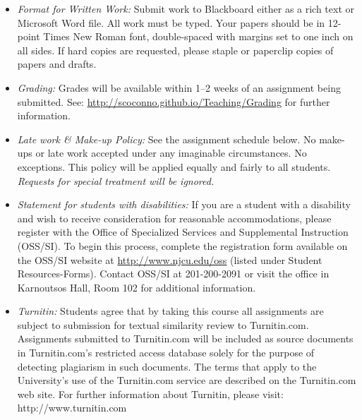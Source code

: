 \documentclass[article,oneside]{memoir}
\begin{document}
\begin{itemize}
\item \textit{Format for Written Work:} Submit work to Blackboard either as a rich text or Microsoft Word file. All work must be typed. Your papers should be in 12-point Times New Roman font, double-spaced with margins set to one inch on all sides. If hard copies are requested, please staple or paperclip copies of papers and drafts.

\item \textit{Grading:} Grades will be available within 1--2 weeks of an assignment being submitted. See: \href{http://scoconno.github.io/Teaching/Grading}{http://scoconno.github.io/Teaching/Grading} for further information.


\item \textit{Late work \& Make-up Policy:} See the assignment schedule below. No make-ups or late work accepted under any imaginable circumstances. No exceptions. This policy will be applied equally and fairly to all students. \emph{Requests for special treatment will be ignored.}

\item \textit{Statement for students with disabilities:} If you are a student with a disability and wish to receive consideration for reasonable accommodations, please register with the Office of Specialized Services and Supplemental Instruction (OSS/SI). To begin this process, complete the registration form available on the OSS/SI website at \href{http://www.njcu.edu/oss}{http://www.njcu.edu/oss} (listed under Student Resources-Forms). Contact OSS/SI at 201-200-2091 or visit the office in Karnoutsos Hall, Room 102 for additional information.

\item \textit{Turnitin:} Students agree that by taking this course all assignments are subject to submission for textual similarity review to Turnitin.com. Assignments submitted to Turnitin.com will be included as source documents in Turnitin.com's restricted access database solely for the purpose of detecting plagiarism in such documents.  The terms that apply to the University’s use of the Turnitin.com service are described on the Turnitin.com web site.  For further information about Turnitin, please visit: http://www.turnitin.com 


\end{itemize}
\end{document}
